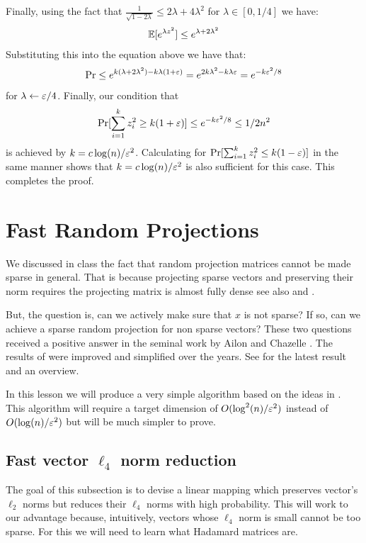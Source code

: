 \documentclass{article}
\begin{document}
Finally, using the fact that $\frac{1}{\sqrt{1-2\lambda}} \le 2\lambda + 4\lambda^2$ for $\lambda \in [0,1/4]$ we have:
\[
{\mathbb E} [e^{\lambda z^{2}}] \le e^{\lambda + 2\lambda^2}
\]
Substituting this into the equation above we have that:
\[
\Pr \le e^{k(\lambda  + 2\lambda^2) - k\lambda (1+\varepsilon)} = e^{ 2k\lambda^2 - k\lambda\varepsilon}  = e^{ - k\varepsilon^2/8}  
\]
for $\lambda \leftarrow \varepsilon/4$. Finally, our condition that 
\[
\Pr[\sum_{i=1}^{k} z^{2}_{i} \ge k(1+\varepsilon)] \le e^{ - k\varepsilon^2/8} \le 1/2n^2
\]
is achieved by $k = c\log(n)/\varepsilon^2$.
Calculating for $\Pr[\sum_{i=1}^{k} z^{2}_{i} \le k(1-\varepsilon)]$ in the same manner shows that $k = c\log(n)/\varepsilon^2$ is also sufficient for this case.
This completes the proof.





\section{Fast Random Projections}
We discussed in class the fact that random projection matrices cannot be made sparse in general.
That is because projecting sparse vectors and preserving their norm requires the projecting matrix is almost fully dense see also \cite{JelaniH2012} and \cite{KaneN12}.

But, the question is, can we actively make sure that $x$ is not sparse? If so, can we achieve a sparse random projection for non sparse vectors?
These two questions received a positive answer in the seminal work by Ailon and Chazelle \cite{AilonCh06}.
The results of \cite{AilonCh06} were improved and simplified over the years. See \cite{AilonL11} for the latest result and an overview.

In this lesson we will produce a very simple algorithm based on the ideas in \cite{AilonCh06}.
This algorithm will require a target dimension of $O(\log^2(n)/\varepsilon^2)$ instead of $O(\log(n)/\varepsilon^2)$ but will be much simpler to prove.

\subsection{Fast vector $\ell_4$ norm reduction}
The goal of this subsection is to devise a linear mapping which preserves vector's $\ell_2$ norms but reduces their $\ell_4$ norms with high probability.
This will work to our advantage because, intuitively, vectors whose $\ell_4$ norm is small cannot be too sparse.
For this we will need to learn what Hadamard matrices are.
\end{document}
